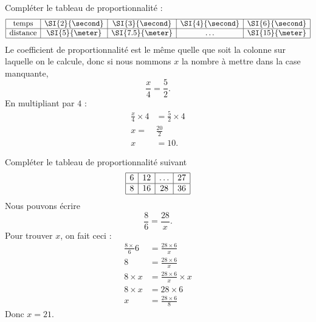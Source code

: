 \begin{example}
    Compléter le tableau de proportionnalité :
    \begin{equation*}
        \begin{array}[]{|c|c|c|c|c|}
            \hline
            \text{temps}&\SI{2}{\second}&\SI{3}{\second}&\SI{4}{\second}&\SI{6}{\second}\\
            \hline
            \text{distance}&\SI{5}{\meter}&\SI{7.5}{\meter}&\ldots&\SI{15}{\meter}\\
            \hline
        \end{array}
    \end{equation*}
    Le coefficient de proportionnalité est le même quelle que soit la colonne sur laquelle on le calcule, donc si nous nommons \( x\) la nombre à mettre dans la case manquante,
    \begin{equation}
        \frac{ x }{ 4 }=\frac{ 5 }{ 2 }.
    \end{equation}
    En multipliant par \( 4\) :
    \begin{subequations}
        \begin{align}
            \frac{ x }{ 4 }\times 4&=\frac{ 5 }{ 2 }\times 4\\
            x=&\frac{ 20 }{ 2 }\\
            x&=10.
        \end{align}
    \end{subequations}
\end{example}

\begin{example}
    Compléter le tableau de proportionnalité suivant
    \begin{equation*}
        \begin{array}[]{|c|c|c|c|}
            \hline
             6&12&\ldots&27\\
              \hline
              8&16&28&36\\ 
              \hline 
               \end{array}
    \end{equation*}
    Nous pouvons écrire
    \begin{equation}
        \frac{ 8 }{ 6 }=\frac{ 28 }{ x }.
    \end{equation}
    Pour trouver \( x\), on fait ceci :
    \begin{subequations}
        \begin{align}
            \frac{ 8\times }{ 6 } 6&=\frac{ 28\times 6 }{ x }\\
            8&=\frac{ 28\times 6 }{ x }\\
            8\times x&=\frac{ 28\times 6 }{ x }\times x\\
            8\times x&=28\times 6\\
            x&=\frac{ 28\times 6 }{ 8 }
        \end{align}
    \end{subequations}
    Donc \( x=21\).
\end{example}

